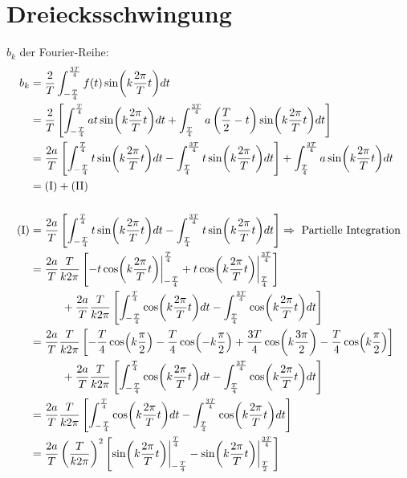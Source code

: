 \section*{Dreiecksschwingung}
$b_k$ der Fourier-Reihe:
\begin{gather}
    \begin{aligned}
        b_k &= \frac{2}{T} \int^{\frac{3T}{4}}_{-\frac{T}{4}} f(t)\sin(k \frac{2\pi}{T} t)dt\\
            &= \frac{2}{T} \left[\int^{\frac{T}{4}}_{-\frac{T}{4}} at\sin(k \frac{2\pi}{T} t)dt+ \int^{\frac{3T}{4}}_{\frac{T}{4}} a\left(\frac{T}{2}-t\right)\sin(k \frac{2\pi}{T} t)dt\right]\\
            &= \frac{2a}{T} \left[\int^{\frac{T}{4}}_{-\frac{T}{4}} t\sin(k \frac{2\pi}{T} t)dt - \int^{\frac{3T}{4}}_{\frac{T}{4}}t\sin(k \frac{2\pi}{T} t)dt\right] + \int^{\frac{3T}{4}}_{\frac{T}{4}}a\sin(k \frac{2\pi}{T} t)dt\\
            &= (\text{I}) + (\text{II})\\[0,5cm]
        (\text{I}) &= \frac{2a}{T} \left[\int^{\frac{T}{4}}_{-\frac{T}{4}} t\sin(k \frac{2\pi}{T} t)
            dt - \int^{\frac{3T}{4}}_{\frac{T}{4}}t\sin(k \frac{2\pi}{T} t)dt\right] \Rightarrow~\text{Partielle Integration}\\
            &= \frac{2a}{T}\frac{T}{k2\pi} \left[-t\cos(k \frac{2\pi}{T} t) \bigg \vert^{\frac{T}{4}}_{-\frac{T}{4}} + t\cos(k \frac{2\pi}{T} t) \bigg \vert^{\frac{3T}{4}}_{\frac{T}{4}}\right]\\
            &\tab+\frac{2a}{T}\frac{T}{k2\pi}\left[\int^{\frac{T}{4}}_{-\frac{T}{4}} \cos(k \frac{2\pi}{T} t)dt - \int^{\frac{3T}{4}}_{\frac{T}{4}} \cos(k \frac{2\pi}{T} t)dt\right]\\
            &= \frac{2a}{T}\frac{T}{k2\pi} \left[-\frac{T}{4}\cos(k \frac{\pi}{2}) -\frac{T}{4}\cos(- k \frac{\pi}{2}) + \frac{3T}{4} \cos(k \frac{3\pi}{2}) - \frac{T}{4} \cos(k \frac{\pi}{2}) \right]\\
            &\tab+\frac{2a}{T}\frac{T}{k2\pi}\left[\int^{\frac{T}{4}}_{-\frac{T}{4}} \cos(k \frac{2\pi}{T} t)dt - \int^{\frac{3T}{4}}_{\frac{T}{4}} \cos(k \frac{2\pi}{T} t)dt\right]\\
            &= \frac{2a}{T}\frac{T}{k2\pi}\left[\int^{\frac{T}{4}}_{-\frac{T}{4}} \cos(k \frac{2\pi}{T} t)dt - \int^{\frac{3T}{4}}_{\frac{T}{4}} \cos(k \frac{2\pi}{T} t)dt\right]\\
            &= \frac{2a}{T}\left(\frac{T}{k2\pi}\right)^2 \left[\sin(k \frac{2\pi}{T} t) \bigg \vert^{\frac{T}{4}}_{-\frac{T}{4}} - \sin(k \frac{2\pi}{T} t) \bigg \vert^{\frac{3T}{4}}_{\frac{T}{2}}\right]\\

\end{aligned}
\end{gather}
